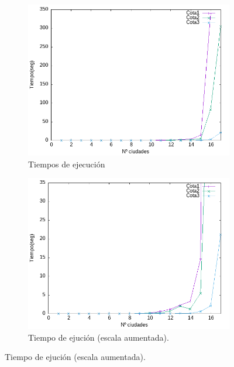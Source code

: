 \documentclass{article}
\begin{document}
\begin{figure}[H]
    \centering
    \begin{subfigure}[b]{0.45\textwidth}
        \centering
        \includegraphics[width=\textwidth]{Sucio_Olga/img/Comparativa_tiempos_BB_linespoints.png}
        \caption{Tiempos de ejecución}
    \end{subfigure}
    \begin{subfigure}[b]{0.45\textwidth}
        \centering
        \includegraphics[width=\textwidth]{Sucio_Olga/img/Comparativa_tiempos_BB_linespointsAcotado.png}
        \caption{Tiempo de ejución (escala aumentada).}
    \end{subfigure}
\end{figure}
\end{document}
